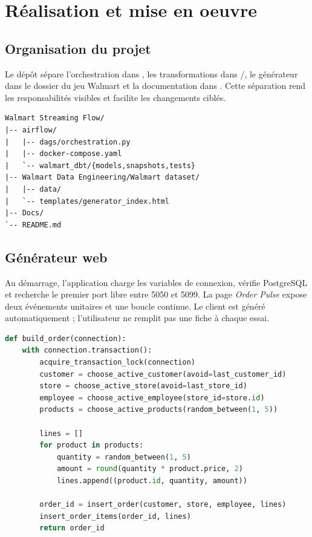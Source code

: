 \chapter{Réalisation et mise en oeuvre}

\section{Organisation du projet}
Le dépôt sépare l'orchestration dans , les transformations dans /, le générateur dans le dossier du jeu Walmart et la documentation dans . Cette séparation rend les responsabilités visibles et facilite les changements ciblés.

\begin{lstlisting}[language={},caption={Arborescence fonctionnelle simplifiée}]
Walmart Streaming Flow/
|-- airflow/
|   |-- dags/orchestration.py
|   |-- docker-compose.yaml
|   `-- walmart_dbt/{models,snapshots,tests}
|-- Walmart Data Engineering/Walmart dataset/
|   |-- data/
|   `-- templates/generator_index.html
|-- Docs/
`-- README.md
\end{lstlisting}

\section{Générateur web}
Au démarrage, l'application charge les variables de connexion, vérifie PostgreSQL et recherche le premier port libre entre 5050 et 5099. La page \emph{Order Pulse} expose deux événements unitaires et une boucle continue. Le client est généré automatiquement ; l'utilisateur ne remplit pas une fiche à chaque essai.

\begin{lstlisting}[language=Python,caption={Pseudocode de création cohérente d'une commande}]
def build_order(connection):
    with connection.transaction():
        acquire_transaction_lock(connection)
        customer = choose_active_customer(avoid=last_customer_id)
        store = choose_active_store(avoid=last_store_id)
        employee = choose_active_employee(store_id=store.id)
        products = choose_active_products(random_between(1, 5))

        lines = []
        for product in products:
            quantity = random_between(1, 5)
            amount = round(quantity * product.price, 2)
            lines.append((product.id, quantity, amount))

        order_id = insert_order(customer, store, employee, lines)
        insert_order_items(order_id, lines)
        return order_id
\end{lstlisting}

